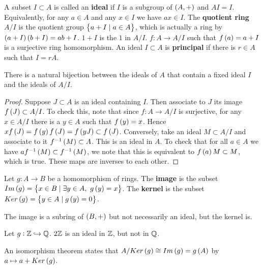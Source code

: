 
\begin{definition}
A subset $ I \subset A $ is called an \textbf{ideal} if $ I $ is a subgroup of $ \br{A, +} $ and $ AI = I $. Equivalently, for any $ a \in A $ and any $ x \in I $ we have $ ax \in I $. The \textbf{quotient ring} $ A / I $ is the quotient group $ \cbr{a + I \mid a \in A} $, which is actually a ring by $ \br{a + I}\br{b + I} = ab + I $. $ 1 + I $ is the $ 1 $ in $ A / I $. $ f : A \to A / I $ such that $ f\br{a} = a + I $ is a surjective ring homomorphism. An ideal $ I \subset A $ is \textbf{principal} if there is $ r \in A $ such that $ I = rA $.
\end{definition}

\begin{proposition}
There is a natural bijection between the ideals of $ A $ that contain a fixed ideal $ I $ and the ideals of $ A / I $.
\end{proposition}

\begin{proof}
Suppose $ J \subset A $ is an ideal containing $ I $. Then associate to $ J $ its image $ f\br{J} \subset A / I $. To check this, note that since $ f : A \to A / I $ is surjective, for any $ x \in A / I $ there is a $ y \in A $ such that $ f\br{y} = x $. Hence $ xf\br{J} = f\br{y}f\br{J} = f\br{yJ} \subset f\br{J} $. Conversely, take an ideal $ M \subset A / I $ and associate to it $ f^{-1}\br{M} \subset A $. This is an ideal in $ A $. To check that for all $ a \in A $ we have $ af^{-1}\br{M} \subset f^{-1}\br{M} $, we note that this is equivalent to $ f\br{a}M \subset M $, which is true. These maps are inverses to each other.
\end{proof}

\begin{definition}
Let $ g : A \to B $ be a homomorphism of rings. The \textbf{image} is the subset $ Im\br{g} = \cbr{x \in B \mid \exists y \in A, \ g\br{y} = x} $. The \textbf{kernel} is the subset $ Ker\br{g} = \cbr{y \in A \mid g\br{y} = 0} $.
\end{definition}

The image is a subring of $ \br{B, +} $ but not necessarily an ideal, but the kernel is.

\begin{example*}
Let $ g : \mathbb{Z} \hookrightarrow \mathbb{Q} $. $ 2\mathbb{Z} $ is an ideal in $ \mathbb{Z} $, but not in $ \mathbb{Q} $.
\end{example*}

An isomorphism theorem states that $ A / Ker\br{g} \cong Im\br{g} = g\br{A} $ by $ a \mapsto a + Ker\br{g} $.

